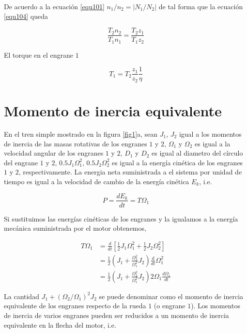 \documentclass[12pt]{book}
\theoremstyle{definition}
\theoremstyle{remark}
\theoremstyle{plain}
\begin{document}
De acuerdo a la ecuación \ref{equ101} $n_1/n_2 = | N_1 / N_2 |$ de tal forma que la ecuación \ref{equ104} queda

\begin{equation}
\label{equ105}
\frac{T_2 n_2}{T_1 n_1} = \frac{T_2 z_1}{T_1 z_2}
\end{equation}

El torque en el engrane $1$

\begin{equation}
\label{equ106}
T_1 = T_2 \frac{z_1}{z_2} \frac{1}{\eta}
\end{equation}

\section{Momento de inercia equivalente}

En el tren simple mostrado en la figura \ref{fig1}a, sean $J_1$, $J_2$ igual a los momentos de inercia de las masas rotativas de los engranes $1$ y $2$, $\Omega _1$ y $\Omega _2$ es igual a la velocidad angular de los engranes $1$ y $2$, $D_1$ y $D_2$ es igual al diametro del círculo del engrane $1$ y $2$, $0.5 J_1 \Omega _1 ^2$, $0.5 J_2 \Omega _2^2$ es igual a la energía cinética de los engranes $1$ y $2$, respectivamente.
La energia neta suministrada a el sistema por unidad de tiempo es igual a la velocidad de cambio de la energía cinética $E_k$, i.e.

\begin{equation}
\label{equ107}
P = \frac{d E_k}{dt}= T \Omega _1
\end{equation}

Si sustituimos las energías cinéticas de los engranes y la igualamos a la energía mecánica suministrada por el motor obtenemos,

\begin{equation}
\label{equ108}
\begin{aligned}
T \Omega_{1} & = \frac{d}{d t} [\frac{1}{2} J_1 \Omega _1 ^2 + \frac{1}{2} J_2 \Omega _2 ^2]\\
 & =\frac{1}{2} (J_1 + \frac{\Omega _2 ^2}{\Omega _1 ^2}J_2) \frac{d}{d t}\Omega _1^2 \\
& = \frac{1}{2} (J_1 + \frac{\Omega _2^2}{\Omega _1^2} J_2) 2 \Omega _1 \frac{d \Omega _1}{d t}
\end{aligned}
\end{equation}

La cantidad $J_1 + (\Omega _2 / \Omega _1)^2 J_2$ se puede denominar como el momento de inercia equivalente de los engranes respecto de la rueda $1$ (o engrane $1$). Los momentos de inercia de varios engranes pueden ser reducidos a un momento de inercia equivalente en la flecha del motor, i.e.
\end{document}
